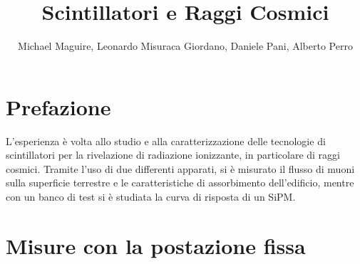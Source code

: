 \documentclass[11pt]{article} %
\title{Scintillatori e Raggi Cosmici}
\author{Michael Maguire, Leonardo Misuraca Giordano, Daniele Pani, Alberto Perro}
\begin{document}
\maketitle
\newpage
\section*{Prefazione}
L'esperienza è volta allo studio e alla caratterizzazione delle tecnologie di scintillatori per la rivelazione di radiazione ionizzante, in particolare di raggi cosmici. Tramite l'uso di due differenti apparati, si è misurato il flusso di muoni sulla superficie terrestre e le caratteristiche di assorbimento dell'edificio, mentre con un banco di test si è studiata la curva di risposta di un SiPM.
\section{Misure con la postazione fissa}
\end{document}
